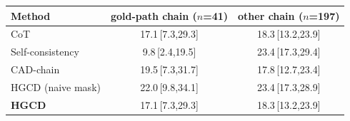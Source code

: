 \begin{tabular}{lcc}
\toprule
Method & gold-path chain ($n$=41) & other chain ($n$=197) \\
\midrule
CoT & 17.1\,{\scriptsize[7.3,29.3]} & 18.3\,{\scriptsize[13.2,23.9]} \\
Self-consistency & 9.8\,{\scriptsize[2.4,19.5]} & 23.4\,{\scriptsize[17.3,29.4]} \\
CAD-chain & 19.5\,{\scriptsize[7.3,31.7]} & 17.8\,{\scriptsize[12.7,23.4]} \\
HGCD (naive mask) & 22.0\,{\scriptsize[9.8,34.1]} & 23.4\,{\scriptsize[17.3,28.9]} \\
\textbf{HGCD} & 17.1\,{\scriptsize[7.3,29.3]} & 18.3\,{\scriptsize[13.2,23.9]} \\
\bottomrule
\end{tabular}
